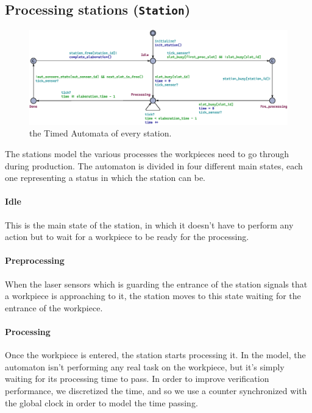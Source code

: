 \documentclass[a4paper]{article}
\begin{document}
    \subsection{Processing stations (\texttt{Station})}

    \begin{figure}[h!]
        \centering
        \includegraphics[width=0.84\columnwidth]{./images/automata/station}
        \caption{the Timed Automata of every station.}
    \end{figure}

    The stations model the various processes the workpieces need to go through during production. The automaton is divided in four different main states, each one representing a status in which the station can be.

    \paragraph{Idle} This is the main state of the station, in which it doesn't have to perform any action but to wait for a workpiece to be ready for the processing.

    \paragraph{Preprocessing} When the laser sensors which is guarding the entrance of the station signals that a workpiece is approaching to it, the station moves to this state waiting for the entrance of the workpiece.

    \paragraph{Processing} Once the workpiece is entered, the station starts processing it. In the model, the automaton isn't performing any real task on the workpiece, but it's simply waiting for its processing time to pass. In order to improve verification performance, we discretized the time, and so we use a counter synchronized with the global clock in order to model the time passing.
\end{document}
